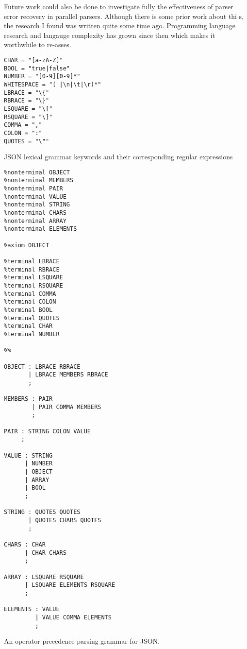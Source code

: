 Future work could also be done to investigate fully the effectiveness of parser error recovery in
parallel parsers. Although there is some prior work about thi s\citep{hammond_survey_1984}, the research I found was written quite some time ago. Programming language research and langauge complexity has grown since then which makes it worthwhile to re-asses.

\begin{listing}[H]
\begin{verbatim}
CHAR = "[a-zA-Z]"
BOOL = "true|false"
NUMBER = "[0-9][0-9]*"
WHITESPACE = "( |\n|\t|\r)*"
LBRACE = "\{"
RBRACE = "\}"
LSQUARE = "\["
RSQUARE = "\]"
COMMA = ","
COLON = ":"
QUOTES = "\""
\end{verbatim}
\caption{JSON lexical grammar keywords and their corresponding regular expressions}
\label{lst:json_lexical_grammar}
\end{listing}

\begin{listing}[H]
\begin{verbatim}
%nonterminal OBJECT
%nonterminal MEMBERS
%nonterminal PAIR
%nonterminal VALUE
%nonterminal STRING
%nonterminal CHARS
%nonterminal ARRAY
%nonterminal ELEMENTS

%axiom OBJECT

%terminal LBRACE
%terminal RBRACE
%terminal LSQUARE
%terminal RSQUARE
%terminal COMMA
%terminal COLON
%terminal BOOL
%terminal QUOTES
%terminal CHAR
%terminal NUMBER

%%

OBJECT : LBRACE RBRACE
       | LBRACE MEMBERS RBRACE
       ;

MEMBERS : PAIR
        | PAIR COMMA MEMBERS
        ;

PAIR : STRING COLON VALUE
     ;

VALUE : STRING
      | NUMBER
      | OBJECT
      | ARRAY
      | BOOL
      ;

STRING : QUOTES QUOTES
       | QUOTES CHARS QUOTES
       ;

CHARS : CHAR
      | CHAR CHARS
      ;

ARRAY : LSQUARE RSQUARE
      | LSQUARE ELEMENTS RSQUARE
      ;

ELEMENTS : VALUE
         | VALUE COMMA ELEMENTS
         ;
\end{verbatim}
\caption{An operator precedence parsing grammar for JSON.}
\label{lst:json_grammar}
\end{listing}


